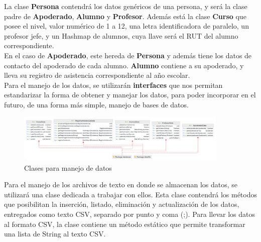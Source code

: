 La clase \textbf{Persona} contendrá los datos genéricos de una persona, y será la clase padre de \textbf{Apoderado}, \textbf{Alumno} y \textbf{Profesor}. Además está la clase \textbf{Curso} que posee el nivel, valor numérico de 1 a 12, una letra identificadora de paralelo, un profesor jefe, y un Hashmap de alumnos, cuya llave será el RUT del alumno correspondiente.\\

En el caso de \textbf{Apoderado}, este hereda de \textbf{Persona} y además tiene los datos de contacto del apoderado de cada alumno. \textbf{Alumno} contiene a su apoderado, y lleva su registro de asistencia correspondiente al año escolar.\\
	
Para el manejo de los datos, se utilizarán \textbf{interfaces} que nos permitan estandarizar la forma de obtener y manejar los datos, para poder incorporar en el futuro, de una forma más simple, manejo de bases de datos.\\

\begin{figure}[h]
    \centering
    \includegraphics[width=0.9\textwidth]{contents/img/img2}
    \caption{Clases para manejo de datos}
    \label{fig:img2}
\end{figure}

Para el manejo de los archivos de texto en donde se almacenan los datos, se utilizará una clase dedicada a trabajar con ellos. Esta clase contendrá los métodos que posibilitan la inserción, listado, eliminación y actualización de los datos, entregados como texto CSV, separado por punto y coma (;). Para llevar los datos al formato CSV, la clase contiene un método estático que permite transformar una lista de String al texto CSV.

